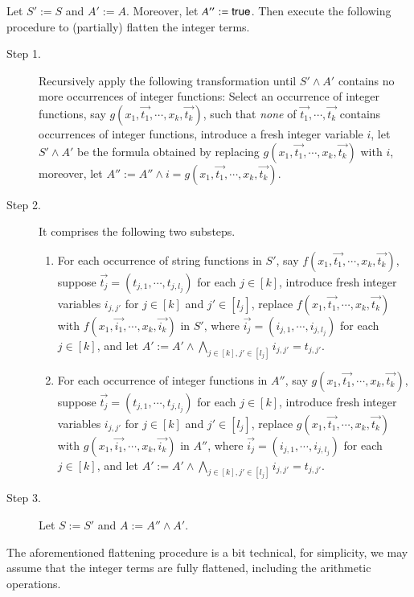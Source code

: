 \documentclass{llncs}
\begin{document}
 

Let $S':=S$ and $A':=A$. Moreover, let $A'':= {\sf true}$. Then execute the following procedure to (partially) flatten the integer terms.
\begin{description}
\item[Step 1.] Recursively apply the following transformation until $S' \wedge A'$ contains no more occurrences of integer functions: Select an occurrence of integer functions, say $g(x_1, \vec{t_1}, \cdots, x_k, \vec{t_k})$, such that 
{\it none} of $\vec{t_1}, \cdots, \vec{t_k}$ contains occurrences of integer functions, introduce a fresh integer variable $i$, let $S' \wedge A'$ be the formula obtained by replacing $g(x_1, \vec{t_1}, \cdots, x_k, \vec{t_k})$ with $i$, moreover, let $A'':= A'' \wedge i = g(x_1, \vec{t_1}, \cdots, x_k, \vec{t_k})$.
%
\item[Step 2.] It comprises the following two substeps. 
\begin{enumerate}
\item For each occurrence of string functions in $S'$, say $f(x_1, \vec{t_1}, \cdots, x_k, \vec{t_k})$, suppose $\vec{t_j} = (t_{j,1}, \cdots, t_{j, l_j})$ for each $j \in [k]$, introduce fresh integer variables $i_{j, j'}$ for $j \in [k]$ and $j' \in [l_j]$, replace $f(x_1, \vec{t_1}, \cdots, x_k, \vec{t_k})$ with $f(x_1, \vec{i_1}, \cdots, x_k, \vec{i_k})$ in $S'$, where $\vec{i_j} = (i_{j,1}, \cdots, i_{j, l_j})$ for each $j \in [k]$, and let $A':=A' \wedge \bigwedge \limits_{j \in [k], j' \in [l_j]} i_{j, j'} = t_{j, j'}$. 
\item For each occurrence of integer functions in $A''$, say $g(x_1, \vec{t_1}, \cdots, x_k, \vec{t_k})$, suppose $\vec{t_j} = (t_{j,1}, \cdots, t_{j, l_j})$ for each $j \in [k]$, introduce fresh integer variables $i_{j, j'}$ for $j \in [k]$ and $j' \in [l_j]$, replace $g(x_1, \vec{t_1}, \cdots, x_k, \vec{t_k})$ with $g(x_1, \vec{i_1}, \cdots, x_k, \vec{i_k})$ in $A''$, where $\vec{i_j} = (i_{j,1}, \cdots, i_{j, l_j})$ for each $j \in [k]$, and let $A':=A' \wedge \bigwedge \limits_{j \in [k], j' \in [l_j]} i_{j, j'} = t_{j, j'}$. 
\end{enumerate}
%
\item[Step 3.] Let $S:=S'$ and $A:=A'' \wedge A' $.
\end{description}
The aforementioned flattening procedure is a bit technical, for simplicity, we may assume that the integer terms are fully flattened, including the arithmetic operations.
\end{document}
